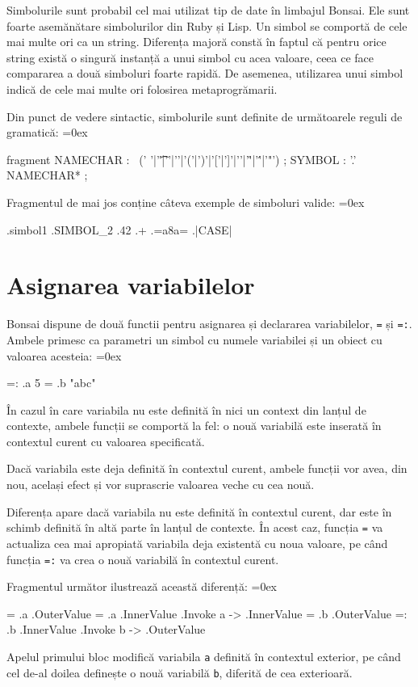 \documentclass[12pt,a4paper]{memoir}
\renewcommand{\c}{\texttt}
\newenvironment{code}
{
\definecolor{shadecolor}{gray}{0.91}
\topsep=0ex
\relax
\shaded
\verbatim
}
{
\endverbatim
\endshaded
}
\begin{document}
Simbolurile sunt probabil cel mai utilizat tip de date în limbajul Bonsai. Ele sunt foarte asemănătare simbolurilor din Ruby\cite{ruby_symbols} și Lisp\cite{clhs_symbols}. Un simbol se comportă de cele mai multe ori ca un string. Diferența majoră constă în faptul că pentru orice string există o singură instanță a unui simbol cu acea valoare, ceea ce face compararea a două simboluri foarte rapidă. De asemenea, utilizarea unui simbol indică de cele mai multe ori folosirea metaprogrămarii.

Din punct de vedere sintactic, simbolurile sunt definite de următoarele reguli de gramatică:
\begin{code}
fragment NAMECHAR
    :   ~(' '|'\t'|'{'|'}'|'('|')'|'['|']'|'\n'|'\r'|'\''|'"')
    ;
SYMBOL
    :   '.' NAMECHAR*
    ;
\end{code}
Fragmentul de mai jos conține câteva exemple de simboluri valide:
\begin{code}
.simbol1
.SIMBOL_2
.42
.+
.=a8a=
.|CASE|
\end{code}

\section{Asignarea variabilelor}

Bonsai dispune de două functii pentru asignarea și declararea variabilelor, \c{=} și \c{=:}. Ambele primesc ca parametri un simbol cu numele variabilei și un obiect cu valoarea acesteia:
\begin{code}
=: .a 5
= .b "abc"
\end{code}

În cazul în care variabila nu este definită în nici un context din lanțul de contexte, ambele funcții se comportă la fel: o nouă variabilă este inserată în contextul curent cu valoarea specificată. 

Dacă variabila este deja definită în contextul curent, ambele funcții vor avea, din nou, același efect și vor suprascrie valoarea veche cu cea nouă.

Diferența apare dacă variabila nu este definită în contextul curent, dar este în schimb definită în altă parte în lanțul de contexte. În acest caz, funcția \c{=} va actualiza cea mai apropiată variabila deja existentă cu noua valoare, pe când funcția \c{=:} va crea o nouă variabilă în contextul curent. 

Fragmentul următor ilustrează această diferență:
\begin{code}
= .a .OuterValue
{ = .a .InnerValue } .Invoke
a
  -> .InnerValue
= .b .OuterValue
{ =: .b .InnerValue } .Invoke
b
  -> .OuterValue
\end{code}
Apelul primului bloc modifică variabila \c{a} definită în contextul exterior, pe când cel de-al doilea definește o nouă variabilă \c{b}, diferită de cea exterioară.
\end{document}
